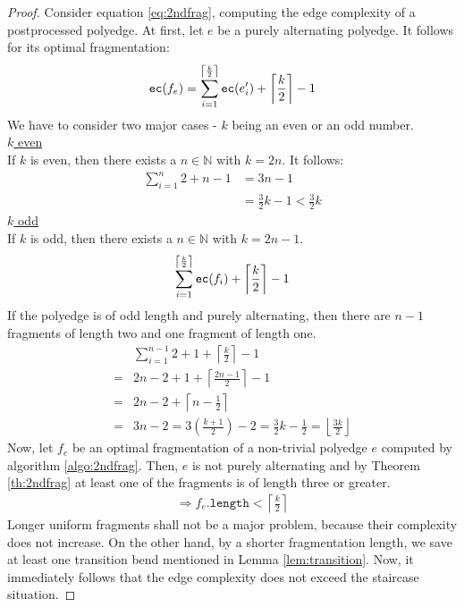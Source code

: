 \begin{proof}
	Consider equation \ref{eq:2ndfrag}, computing the edge complexity of a postprocessed polyedge. At first, let $e$ be a purely alternating polyedge. It follows for its optimal fragmentation:
	\begin{align*}
	\texttt{ec}(f_e) = \sum_{i=1}^{\left\lceil\frac{k}{2}\right\rceil} \texttt{ec}(e'_i) + \left\lceil\frac{k}{2}\right\rceil - 1
	\end{align*}
	We have to consider two major cases - $k$ being an even or an odd number.\\
	\underline{$k$ even}\\
	If $k$ is even, then there exists a $n \in \mathbb{N}$ with $k = 2n$. It follows:
	\begin{align*}
	\sum_{i=1}^{n} 2 + n - 1 &= 3n - 1\\
	&= \frac{3}{2}k - 1 < \frac{3}{2}k
	\end{align*}
	\underline{$k$ odd}\\
	If $k$ is odd, then there exists a $n \in \mathbb{N}$ with $k = 2n-1$.
	\begin{align*}
	\sum_{i=1}^{\left\lceil\frac{k}{2}\right\rceil} \texttt{ec}(f_i) + \left\lceil\frac{k}{2}\right\rceil - 1
	\end{align*}
	If the polyedge is of odd length and purely alternating, then there are $n-1$ fragments of length two and one fragment of length one.
	\begin{align*}
	&\sum_{i=1}^{n-1} 2 + 1 + \left\lceil\frac{k}{2}\right\rceil - 1\\
	= &2n - 2 + 1 + \left\lceil\frac{2n-1}{2}\right\rceil - 1\\
	= &2n - 2 + \left\lceil n-\frac{1}{2}\right\rceil\\
	= &3n-2 = 3\left(\frac{k+1}{2}\right) - 2 = \frac{3}{2}k - \frac{1}{2} = \left\lfloor\frac{3k}{2}\right\rfloor
	\end{align*}
	Now, let $f_e$ be an optimal fragmentation of a non-trivial polyedge $e$ computed by algorithm \ref{algo:2ndfrag}. Then, $e$ is not purely alternating and by Theorem \ref{th:2ndfrag} at least one of the fragments is of length three or greater. 
	\begin{align*}
	\Rightarrow f_e\texttt{.length} < \left\lceil\frac{k}{2}\right\rceil
	\end{align*}
	Longer uniform fragments shall not be a major problem, because their complexity does not increase. On the other hand, by a shorter fragmentation length, we save at least one transition bend mentioned in Lemma \ref{lem:transition}. Now, it immediately follows that the edge complexity does not exceed the staircase situation.
\end{proof}
